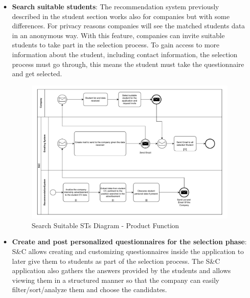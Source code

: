 \begin{itemize}
      \item \textbf{Search suitable students}: The recommendation system previously described in the student section
            works also for companies but with some differences. For privacy reasons companies will see the matched
            students data in an anonymous way. With this feature, companies can invite suitable students to take part
            in the selection process. To gain access to more information about the student, including contact
            information, the selection process must go through, this means the student must take the questionnaire and
            get selected.

            \begin{figure}[H]
                  \centering
                  \includegraphics[width=1.0\textwidth]{Images/BPMN_10.pdf}
                  \caption{Search Suitable STs Diagram - Product Function}
                  \label{fig:search_suitable_students_diagram}
            \end{figure}

      \item \textbf{Create and post personalized questionnaires for the selection phase}: S\&C allows creating and
            customizing questionnaires inside the application to later give them to students as part of the selection
            process. The S\&C application also gathers the answers provided by the students and allows viewing them in
            a structured manner so that the company can easily filter/sort/analyze them and choose the candidates.


\end{itemize}
